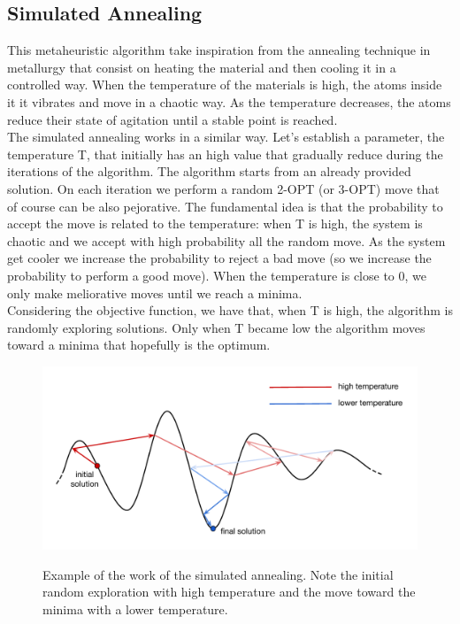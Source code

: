 \subsection{Simulated Annealing}
This metaheuristic algorithm take inspiration from the annealing technique in metallurgy that consist on heating the material and then cooling it in a controlled way. When the temperature of the materials is high, the atoms inside it it vibrates and move in a chaotic way. As the temperature decreases, the atoms reduce their state of agitation until a stable point is reached. \\
The simulated annealing works in a similar way. Let's establish a parameter, the temperature T, that initially has an high value that gradually reduce during the iterations of the algorithm. The algorithm starts from an already provided solution. On each iteration we perform a random 2-OPT (or 3-OPT) move that of course can be also pejorative. The fundamental idea is that the probability to accept the move is related to the temperature: when T is high, the system is chaotic and we accept with high probability all the random move. As the system get cooler we increase the probability to reject a bad move (so we increase the probability to perform a good move). When the temperature is close to 0, we only make meliorative moves until we reach a minima.\\
Considering the objective function, we have that, when T is high, the algorithm is randomly exploring solutions. Only when T became low the algorithm moves toward a minima that hopefully is the optimum.

\begin{figure}[h!]
\centering
	\includegraphics[scale=0.77]{media/sim_annealing.pdf} \\
	\caption{Example of the work of the simulated annealing. Note the initial random exploration with high temperature and the move toward the minima with a lower temperature.}
\end{figure}

